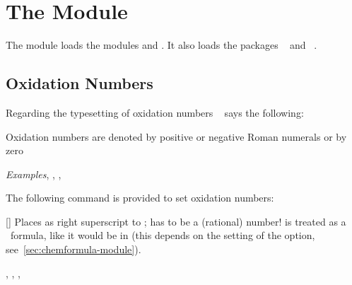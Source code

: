 \documentclass{chemmacros-manual}
\begin{document}
\section{The  Module}\label{sec:redox-module}

The  module loads the modules  and
. It also loads the packages
~\cite{pkg:mathtools} and ~\cite{pkg:relsize}.

\subsection{Oxidation Numbers}\label{sec:oxidation-numbers}

Regarding the typesetting of oxidation numbers
~\cite{iupac:greenbook} says the following:
\begin{cnltxquote}
  Oxidation numbers are denoted by positive or negative Roman numerals or by
  zero \textelp{}

  \textit{Examples}\quad {}, , ,
\end{cnltxquote}

The following command is provided to set oxidation numbers:
\begin{commands}
  [\sarg{}]
    Places  as right superscript to ; 
    has to be a (rational) number!   is treated as a \chemformula\
    formula, like it would be in  (this depends on the setting of
    the \option{formula} option, see~\vref{sec:chemformula-module}).
\end{commands}

\begin{example}
  , , , 
\end{example}
\end{document}
